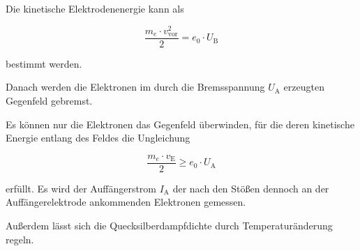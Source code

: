 Die kinetische Elektrodenenergie kann als

\begin{equation}
    \frac{m_e \cdot v_\text{vor}^2}{2} = e_0 \cdot U_\text{B}
\end{equation}

bestimmt werden.

Danach werden die Elektronen im durch die Bremsspannung $U_\text{A}$ erzeugten
Gegenfeld gebremst. 

Es können nur die Elektronen das Gegenfeld überwinden, für die deren kinetische
Energie entlang des Feldes die Ungleichung

\begin{equation}
    \frac{m_e \cdot v_\text{E}}{2} \geq e_0 \cdot U_\text{A}
\end{equation}

erfüllt.
Es wird der Auffängerstrom $I_\text{A}$ der nach den Stößen dennoch an der Auffängerelektrode ankommenden
Elektronen gemessen.

Außerdem lässt sich die Quecksilberdampfdichte durch Temperaturänderung regeln.

